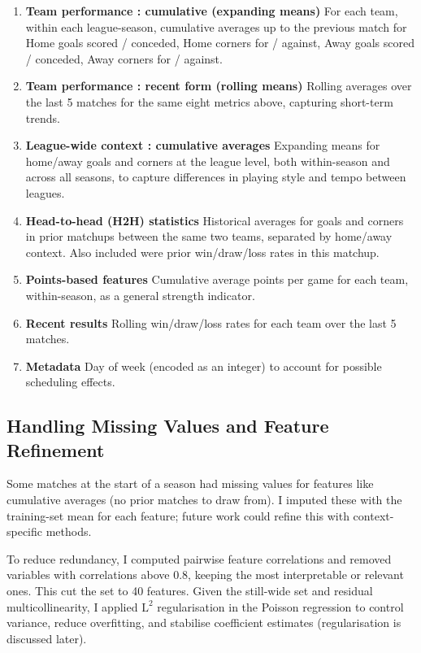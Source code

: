 \documentclass[12pt]{article}
\begin{document}
\begin{enumerate}
    \item \textbf{Team performance : cumulative (expanding means)}  
    For each team, within each league-season, cumulative averages up to the previous match for
    Home goals scored / conceded,  Home corners for / against,
    Away goals scored / conceded, Away corners for / against.

    \item \textbf{Team performance : recent form (rolling means)}  
    Rolling averages over the last 5 matches for the same eight metrics above, capturing short-term trends.

    \item \textbf{League-wide context :  cumulative averages}  
    Expanding means for home/away goals and corners at the league level, both within-season and across all seasons, to capture differences in playing style and tempo between leagues.

    \item \textbf{Head-to-head (H2H) statistics}  
    Historical averages for goals and corners in prior matchups between the same two teams, separated by home/away context.  
    Also included were prior win/draw/loss rates in this matchup.

    \item \textbf{Points-based features}  
    Cumulative average points per game for each team, within-season, as a general strength indicator.

    \item \textbf{Recent results}  
    Rolling win/draw/loss rates for each team over the last 5 matches.

    \item \textbf{Metadata}  
    Day of week (encoded as an integer) to account for possible scheduling effects.
\end{enumerate}

\subsection*{Handling Missing Values and Feature Refinement}

Some matches at the start of a season had missing values for features like cumulative averages (no prior matches to draw from).
I imputed these with the training-set mean for each feature; future work could refine this with context-specific methods.

To reduce redundancy, I computed pairwise feature correlations and removed variables with correlations above 0.8, keeping the most interpretable or relevant ones.
This cut the set to 40 features.
Given the still-wide set and residual multicollinearity, I applied $\mathrm{L}^2$ regularisation in the Poisson regression to control variance, reduce overfitting, and stabilise coefficient estimates (regularisation is discussed later).
\end{document}
